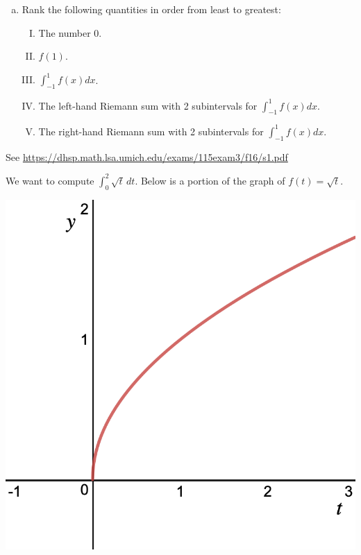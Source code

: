 \documentclass[11pt]{exam}
\begin{document}
\begin{questions}
\begin{enumerate}[(a)]
		\item Rank the following quantities in order from least to greatest:
		\begin{enumerate}[I.]
		\item The number $0$.
		\item $f(1)$.
		\item $\displaystyle\int_{-1}^1 f(x) dx$.
		\item The left-hand Riemann sum with 2 subintervals for $\displaystyle\int_{-1}^1 f(x) dx$.
		\item The right-hand Riemann sum with 2 subintervals for $\displaystyle\int_{-1}^1 f(x) dx$.
		\end{enumerate}
	\end{enumerate}
        \begin{solution}
          See \href{https://dhsp.math.lsa.umich.edu/exams/115exam3/f16/s1.pdf}{https://dhsp.math.lsa.umich.edu/exams/115exam3/f16/s1.pdf}
        \end{solution}
        \pagebreak
\question We want to compute $\displaystyle\int_0^2 \sqrt{t} \, dt$. Below is a portion of the graph of $f(t)=\sqrt{t}$.
  \begin{center}
    \includegraphics[scale=.2]{Figures/sqrt}
  \end{center}
\begin{enumerate}[(a)]

\end{enumerate}
\end{questions}
\end{document}
